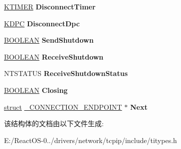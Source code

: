 \begin{DoxyCompactItemize}
\hyperlink{struct___k_t_i_m_e_r}{K\+T\+I\+M\+ER} {\bfseries Disconnect\+Timer}
\item 
\mbox{\label{struct___c_o_n_n_e_c_t_i_o_n___e_n_d_p_o_i_n_t_a84a66a5484a90cc10741a3398165994e}} 
\hyperlink{struct___k_d_p_c}{K\+D\+PC} {\bfseries Disconnect\+Dpc}
\item 
\mbox{\label{struct___c_o_n_n_e_c_t_i_o_n___e_n_d_p_o_i_n_t_a45ec8a20fc30d8d6d361966346fceded}} 
\hyperlink{_processor_bind_8h_a112e3146cb38b6ee95e64d85842e380a}{B\+O\+O\+L\+E\+AN} {\bfseries Send\+Shutdown}
\item 
\mbox{\label{struct___c_o_n_n_e_c_t_i_o_n___e_n_d_p_o_i_n_t_add4e5c34d69b3ce0dd071bd0fe1650ba}} 
\hyperlink{_processor_bind_8h_a112e3146cb38b6ee95e64d85842e380a}{B\+O\+O\+L\+E\+AN} {\bfseries Receive\+Shutdown}
\item 
\mbox{\label{struct___c_o_n_n_e_c_t_i_o_n___e_n_d_p_o_i_n_t_a3a47b87e9232094d976bc1ab5c1563ef}} 
N\+T\+S\+T\+A\+T\+US {\bfseries Receive\+Shutdown\+Status}
\item 
\mbox{\label{struct___c_o_n_n_e_c_t_i_o_n___e_n_d_p_o_i_n_t_add1e2cd588eb9f8afa4e3d200e5ccc48}} 
\hyperlink{_processor_bind_8h_a112e3146cb38b6ee95e64d85842e380a}{B\+O\+O\+L\+E\+AN} {\bfseries Closing}
\item 
\mbox{\label{struct___c_o_n_n_e_c_t_i_o_n___e_n_d_p_o_i_n_t_ada856be5a44e47a05a2e1364b61b32c5}} 
\hyperlink{interfacestruct}{struct} \hyperlink{struct___c_o_n_n_e_c_t_i_o_n___e_n_d_p_o_i_n_t}{\+\_\+\+C\+O\+N\+N\+E\+C\+T\+I\+O\+N\+\_\+\+E\+N\+D\+P\+O\+I\+NT} $\ast$ {\bfseries Next}
\end{DoxyCompactItemize}


该结构体的文档由以下文件生成\+:\begin{DoxyCompactItemize}
\item 
E\+:/\+React\+O\+S-\/0../drivers/network/tcpip/include/titypes.\+h\end{DoxyCompactItemize}
